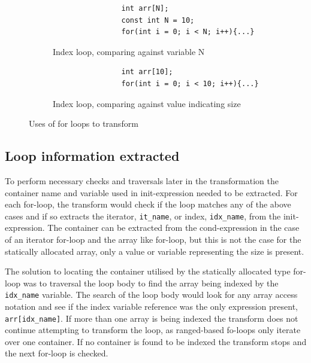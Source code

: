\documentclass[bsc,frontabs,singlespacing,twoside,parskip,deptreport]{infthesis}
\begin{document}
\begin{figure}[h]
    \centering
    \begin{subfigure}[h]{\textwidth}
        \centering
        \begin{verbatim}
                int arr[N];
                const int N = 10;
                for(int i = 0; i < N; i++){...}
        \end{verbatim}
        \caption{Index loop, comparing against variable N}
        \label{fig:code-static-for-cmp-var}
        \vspace{0.40cm}
    \end{subfigure}

    \begin{subfigure}[h]{\textwidth}
    \begin{verbatim}
                int arr[10];
                for(int i = 0; i < 10; i++){...}
    \end{verbatim}
    \caption{Index loop, comparing against value indicating size}
    \centering
    \label{fig:code-static-for-cmp-num}
    \end{subfigure}

    \caption{Uses of for loops to transform}
    \label{fig:code-static-for-cm}
\end{figure}


\subsection{Loop information extracted}
To perform necessary checks and traversals later in the transformation the container name and variable used in init-expression needed to be extracted. For each for-loop, the transform would check if the loop matches any of the above cases and if so extracts the iterator, \texttt{it\_name}, or index,  \texttt{idx\_name}, from the init-expression. The container can be extracted from the cond-expression in the case of an iterator for-loop and the array like for-loop, but this is not the case for the statically allocated array, only a value or variable representing the size is present. 

The solution to locating the container utilised by the statically allocated type for-loop was to traversal the loop body to find the array being indexed by the \texttt{idx\_name} variable. The search of the loop body would look for any array access notation and see if the index variable reference was the only expression present, \texttt{arr[idx\_name]}. If more than one array is being indexed the transform does not continue attempting to transform the loop, as ranged-based fo-loops only iterate over one container. If no container is found to be indexed the transform stops and the next for-loop is checked.
\end{document}
